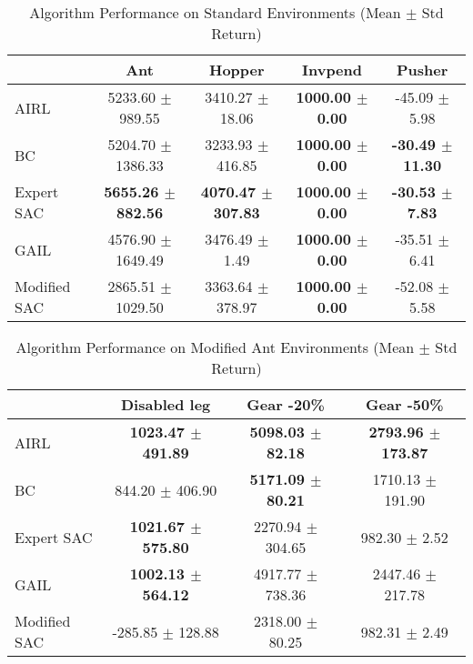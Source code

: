 \documentclass{article}
\begin{document}
\pagestyle{empty}


\begin{table}
\caption{Algorithm Performance on Standard Environments (Mean $\pm$ Std Return)}
\label{tab:perf_standard}
\begin{adjustbox}{max width=\textwidth, center}
\begin{tabular}{lcccc}
\toprule
 & Ant & Hopper & Invpend & Pusher \\
\midrule
AIRL & 5233.60 $\pm$ 989.55 & 3410.27 $\pm$ 18.06 & \textbf{1000.00 $\pm$ 0.00} & -45.09 $\pm$ 5.98 \\
BC & 5204.70 $\pm$ 1386.33 & 3233.93 $\pm$ 416.85 & \textbf{1000.00 $\pm$ 0.00} & \textbf{-30.49 $\pm$ 11.30} \\
Expert SAC & \textbf{5655.26 $\pm$ 882.56} & \textbf{4070.47 $\pm$ 307.83} & \textbf{1000.00 $\pm$ 0.00} & \textbf{-30.53 $\pm$ 7.83} \\
GAIL & 4576.90 $\pm$ 1649.49 & 3476.49 $\pm$ 1.49 & \textbf{1000.00 $\pm$ 0.00} & -35.51 $\pm$ 6.41 \\
Modified SAC & 2865.51 $\pm$ 1029.50 & 3363.64 $\pm$ 378.97 & \textbf{1000.00 $\pm$ 0.00} & -52.08 $\pm$ 5.58 \\
\bottomrule
\end{tabular}
\end{adjustbox}
\end{table}



\begin{table}
\caption{Algorithm Performance on Modified Ant Environments (Mean $\pm$ Std Return)}
\label{tab:perf_mod_ant}
\begin{adjustbox}{max width=\textwidth, center}
\begin{tabular}{lccc}
\toprule
 & Disabled leg & Gear -20\% & Gear -50\% \\
\midrule
AIRL & \textbf{1023.47 $\pm$ 491.89} & \textbf{5098.03 $\pm$ 82.18} & \textbf{2793.96 $\pm$ 173.87} \\
BC & 844.20 $\pm$ 406.90 & \textbf{5171.09 $\pm$ 80.21} & 1710.13 $\pm$ 191.90 \\
Expert SAC & \textbf{1021.67 $\pm$ 575.80} & 2270.94 $\pm$ 304.65 & 982.30 $\pm$ 2.52 \\
GAIL & \textbf{1002.13 $\pm$ 564.12} & 4917.77 $\pm$ 738.36 & 2447.46 $\pm$ 217.78 \\
Modified SAC & -285.85 $\pm$ 128.88 & 2318.00 $\pm$ 80.25 & 982.31 $\pm$ 2.49 \\
\bottomrule
\end{tabular}
\end{adjustbox}
\end{table}
\end{document}
